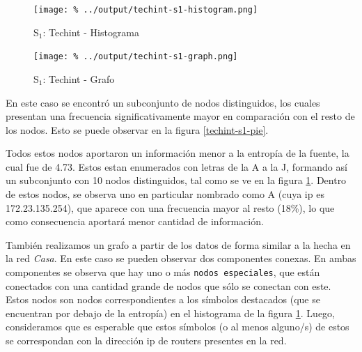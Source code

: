 \documentclass[final,inline,a4paper,narroweqnarray]{ieee}
\begin{document}
    \begin{figure}[H]\begin{center}
      \texttt{[image: \%
      ../output/techint-s1-histogram.png]}
      \vspace{-2em}
      \caption{S$_1$: Techint - Histograma}
      \label{techint-s1-histogram}
    \end{center}\end{figure}
  
    \begin{figure}[H]\begin{center}
      \texttt{[image: \%
      ../output/techint-s1-graph.png]}
      \vspace{-2em}
      \caption{S$_1$: Techint - Grafo}
      \label{techint-s1-graph}
    \end{center}\end{figure}
  

  En este caso se encontró un subconjunto de nodos distinguidos, los
  cuales presentan una frecuencia significativamente mayor en
  comparación con el resto de los nodos. Esto se puede observar en la
  figura \ref{techint-s1-pie}. 

  Todos estos nodos aportaron un información menor a la entropía de la
  fuente, la cual fue de 4.73. Estos estan enumerados con letras de la
  A a la J, formando así un subconjunto con 10 nodos distinguidos, tal
  como se ve en la figura \ref{techint-s1-histogram}. Dentro de estos
  nodos, se observa uno en particular nombrado como A (cuya ip es
  172.23.135.254), que aparece con una frecuencia mayor al resto
  (18\%), lo que como consecuencia aportará menor cantidad de
  información.

  También realizamos un grafo a partir de los datos de forma similar a
  la hecha en la red \emph{Casa}. En este caso se pueden observar dos
  componentes conexas. En ambas componentes se observa que hay uno o
  más \texttt{nodos especiales}, que están conectados con una cantidad
  grande de nodos que sólo se conectan con este. Estos nodos son nodos
  correspondientes a los símbolos destacados (que se encuentran por
  debajo de la entropía) en el histograma de la figura
  \ref{techint-s1-histogram}. Luego, consideramos que es esperable que
  estos símbolos (o al menos alguno/s) de estos se correspondan con la
  dirección ip de routers presentes en la red.
\end{document}
